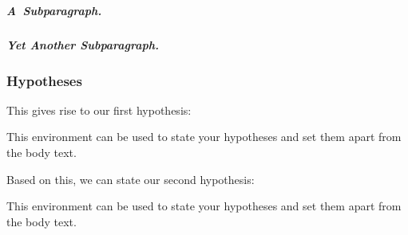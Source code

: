 \subparagraph{A~Subparagraph.}
\blindtext

\subparagraph{Yet Another Subparagraph.}
\blindtext

\subsubsection{Hypotheses}
\blindtext
This gives rise to our first hypothesis:

\begin{hypothesis} \label{hy:UNBAL}
This environment can be used to state your hypotheses and set them apart from the body text.
\end{hypothesis}

\blindtext
Based on this, we can state our second hypothesis:

\begin{hypothesis} \label{hy:UNBAL_2}
This environment can be used to state your hypotheses and set them apart from the body text.
\end{hypothesis}

\blindtext